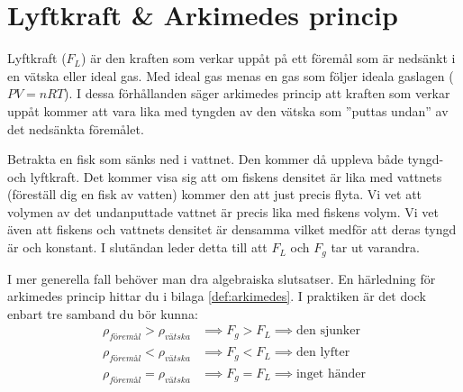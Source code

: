 \section{Lyftkraft \& Arkimedes princip}
Lyftkraft ($F_L$) är den kraften som verkar uppåt på ett föremål som är nedsänkt i en vätska eller ideal gas. Med ideal gas menas en gas som följer ideala gaslagen ($PV=nRT$). I dessa förhållanden säger arkimedes princip att kraften som verkar uppåt kommer att vara lika med tyngden av den vätska som ''puttas undan'' av det nedsänkta föremålet.
\begin{exm}
    Betrakta en fisk som sänks ned i vattnet. Den kommer då uppleva både tyngd- och lyftkraft. Det kommer visa sig att om fiskens densitet är lika med vattnets (föreställ dig en fisk av vatten) kommer den att just precis flyta. Vi vet att volymen av det undanputtade vattnet är precis lika med fiskens volym. Vi vet även att fiskens och vattnets densitet är densamma vilket medför att deras tyngd är och konstant. I slutändan leder detta till att $F_L$ och $F_g$ tar ut varandra.
    \begin{center}
    \end{center}
\end{exm}
I mer generella fall behöver man dra algebraiska slutsatser. En härledning för arkimedes princip hittar du i bilaga \ref{def:arkimedes}. I praktiken är det dock enbart tre samband du bör kunna:
\begin{align*}
    \rho_{\textit{föremål}} > \rho_{\textit{vätska}} &\implies F_g > F_L \implies \text{den sjunker} \\
    \rho_{\textit{föremål}} < \rho_{\textit{vätska}} &\implies F_g < F_L \implies \text{den lyfter} \\
    \rho_{\textit{föremål}} = \rho_{\textit{vätska}} &\implies F_g = F_L \implies \text{inget händer} 
\end{align*}
